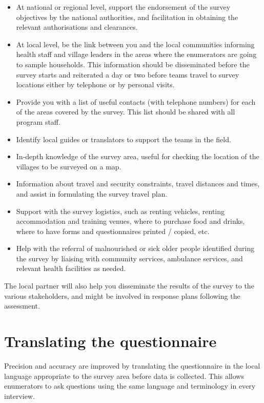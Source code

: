 \documentclass[12pt,a4paper]{book}
\begin{document}
\begin{itemize}
\item
  At national or regional level, support the endorsement of the survey objectives by the national authorities, and facilitation in obtaining the relevant authorisations and clearances.
\item
  At local level, be the link between you and the local communities informing health staff and village leaders in the areas where the enumerators are going to sample households. This information should be disseminated before the survey starts and reiterated a day or two before teams travel to survey locations either by telephone or by personal visits.
\item
  Provide you with a list of useful contacts (with telephone numbers) for each of the areas covered by the survey. This list should be shared with all program staff.
\item
  Identify local guides or translators to support the teams in the field.
\item
  In-depth knowledge of the survey area, useful for checking the location of the villages to be surveyed on a map.
\item
  Information about travel and security constraints, travel distances and times, and assist in formulating the survey travel plan.
\item
  Support with the survey logistics, such as renting vehicles, renting accommodation and training venues, where to purchase food and drinks, where to have forms and questionnaires printed / copied, etc.
\item
  Help with the referral of malnourished or sick older people identified during the survey by liaising with community services, ambulance services, and relevant health facilities as needed.
\end{itemize}

The local partner will also help you disseminate the results of the survey to the various stakeholders, and might be involved in response plans following the assessment.

\hypertarget{translating-the-questionnaire}{%
\section{Translating the questionnaire}\label{translating-the-questionnaire}}

Precision and accuracy are improved by translating the questionnaire in the local language appropriate to the survey area before data is collected. This allows enumerators to ask questions using the same language and terminology in every interview.
\end{document}
